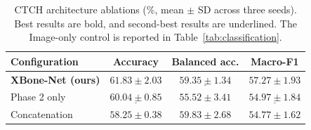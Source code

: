 \begin{table}[t]
\caption{CTCH architecture ablations (\%, mean $\pm$ SD across three seeds). Best results are bold, and second-best results are underlined. The Image-only control is reported in Table~\ref{tab:classification}.}
\label{tab:ablation}
\centering\footnotesize
\setlength{\tabcolsep}{3.5pt}
\begin{tabular}{@{}lccc@{}}
\toprule
Configuration & Accuracy & Balanced acc. & Macro-F1 \\
\midrule
\textbf{XBone-Net (ours)} & $\mathbf{61.83\pm2.03}$ & $\underline{59.35\pm1.34}$ & $\mathbf{57.27\pm1.93}$ \\
Phase 2 only & $\underline{60.04\pm0.85}$ & $55.52\pm3.41$ & $\underline{54.97\pm1.84}$ \\
Concatenation & $58.25\pm0.38$ & $\mathbf{59.83\pm2.68}$ & $54.77\pm1.62$ \\
\bottomrule
\end{tabular}
\end{table}
